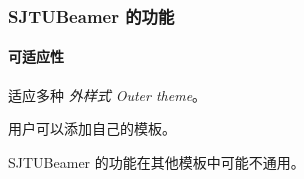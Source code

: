 \documentclass{ctexbeamer}
\begin{document}
\begin{frame}
  \frametitle{SJTUBeamer 的功能}

  \paragraph{可适应性} 适应多种 \emph{外样式 Outer theme}。

  用户可以添加自己的\alert{模板}。

   SJTUBeamer 的功能在其他模板中可能不通用。
\end{frame}
\end{document}
